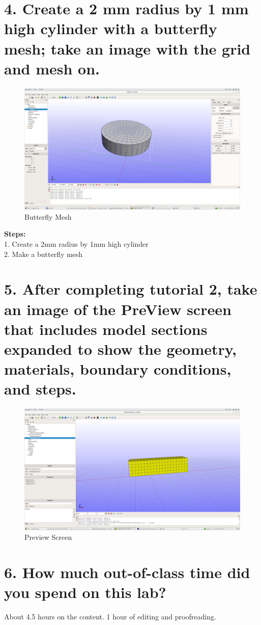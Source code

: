 \documentclass[a4paper,oneside,11pt]{report}
\begin{document}
\section*{4. Create a 2 mm radius by 1 mm high cylinder with a butterfly mesh; take an image with the grid and mesh on.}
\begin{figure}[htb]
	\includegraphics[width=\linewidth]{a0101.png}
	\caption{Butterfly Mesh}
	\label{fig:a0101}
\end{figure}
\textbf{Steps:} \\
1. Create a 2mm radius by 1mm high cylinder \\
2. Make a butterfly mesh \\
\section*{5. After completing tutorial 2, take an image of the PreView screen that includes model sections expanded to show the geometry, materials, boundary conditions, and steps.}
\begin{figure}[htb]
	\includegraphics[width=\linewidth]{a0102.png}
	\caption{Preview Screen}
	\label{fig:a0102}
\end{figure}
\section*{6. How much out-of-class time did you spend on this lab?}
About 4.5 hours on the content. 1 hour of editing and proofreading. 
\end{document}
